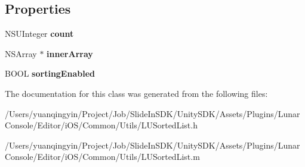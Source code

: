 \subsection*{Properties}
\begin{DoxyCompactItemize}
\item 
\mbox{\label{interface_l_u_sorted_list_a72da96d49ee2c12760eadb0613db6b9c}} 
N\+S\+U\+Integer {\bfseries count}
\item 
\mbox{\label{interface_l_u_sorted_list_a9cd3ba6f93a6130e3886a0334412ba50}} 
N\+S\+Array $\ast$ {\bfseries inner\+Array}
\item 
\mbox{\label{interface_l_u_sorted_list_a3732762e5cb7f0ce6fa4f4541ccd9245}} 
B\+O\+OL {\bfseries sorting\+Enabled}
\end{DoxyCompactItemize}


The documentation for this class was generated from the following files\+:\begin{DoxyCompactItemize}
\item 
/\+Users/yuanqingyin/\+Project/\+Job/\+Slide\+In\+S\+D\+K/\+Unity\+S\+D\+K/\+Assets/\+Plugins/\+Lunar\+Console/\+Editor/i\+O\+S/\+Common/\+Utils/L\+U\+Sorted\+List.\+h\item 
/\+Users/yuanqingyin/\+Project/\+Job/\+Slide\+In\+S\+D\+K/\+Unity\+S\+D\+K/\+Assets/\+Plugins/\+Lunar\+Console/\+Editor/i\+O\+S/\+Common/\+Utils/L\+U\+Sorted\+List.\+m\end{DoxyCompactItemize}
